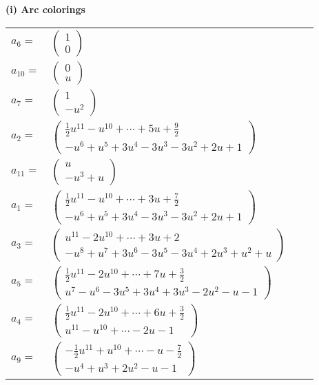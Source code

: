 \documentclass[1p]{elsarticle_modified}
\theoremstyle{definition}
\begin{document}
\flushleft \textbf{(i) Arc colorings}\\
\begin{tabular}{m{7pt} m{180pt} m{7pt} m{180pt} }
\flushright $a_{6}=$&$\begin{pmatrix}1\\0\end{pmatrix}$ \\
\flushright $a_{10}=$&$\begin{pmatrix}0\\u\end{pmatrix}$ \\
\flushright $a_{7}=$&$\begin{pmatrix}1\\- u^2\end{pmatrix}$ \\
\flushright $a_{2}=$&$\begin{pmatrix}\frac{1}{2} u^{11}- u^{10}+\cdots+5 u+\frac{9}{2}\\- u^6+u^5+3 u^4-3 u^3-3 u^2+2 u+1\end{pmatrix}$ \\
\flushright $a_{11}=$&$\begin{pmatrix}u\\- u^3+u\end{pmatrix}$ \\
\flushright $a_{1}=$&$\begin{pmatrix}\frac{1}{2} u^{11}- u^{10}+\cdots+3 u+\frac{7}{2}\\- u^6+u^5+3 u^4-3 u^3-3 u^2+2 u+1\end{pmatrix}$ \\
\flushright $a_{3}=$&$\begin{pmatrix}u^{11}-2 u^{10}+\cdots+3 u+2\\- u^8+u^7+3 u^6-3 u^5-3 u^4+2 u^3+u^2+u\end{pmatrix}$ \\
\flushright $a_{5}=$&$\begin{pmatrix}\frac{1}{2} u^{11}-2 u^{10}+\cdots+7 u+\frac{3}{2}\\u^7- u^6-3 u^5+3 u^4+3 u^3-2 u^2- u-1\end{pmatrix}$ \\
\flushright $a_{4}=$&$\begin{pmatrix}\frac{1}{2} u^{11}-2 u^{10}+\cdots+6 u+\frac{3}{2}\\u^{11}- u^{10}+\cdots-2 u-1\end{pmatrix}$ \\
\flushright $a_{9}=$&$\begin{pmatrix}-\frac{1}{2} u^{11}+u^{10}+\cdots- u-\frac{7}{2}\\- u^4+u^3+2 u^2- u-1\end{pmatrix}$ \\

\end{tabular}
\end{document}
